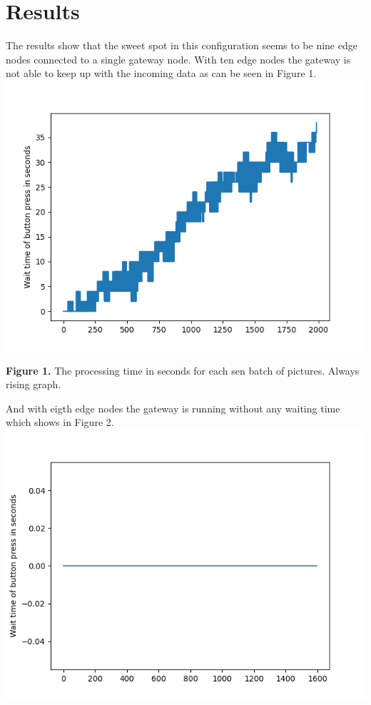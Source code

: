 \documentclass[a4paper,11pt,notitlepage,twocolumn]{article}
\begin{document}
  \section{Results}
    The results show that the sweet spot in this configuration seems to be nine edge nodes
    connected to a single gateway node. With ten edge nodes the gateway is not able to keep
    up with the incoming data as can be seen in Figure 1. \includegraphics[scale=0.5]{Figure_1.png}
    {\footnotesize \textbf{Figure 1.} The processing time in seconds for each sen batch of pictures.
    Always rising graph. \par} And with eigth edge nodes the gateway is
    running without any waiting time which shows in Figure 2. \includegraphics[scale=0.5]{Figure_2.png}
\end{document}
